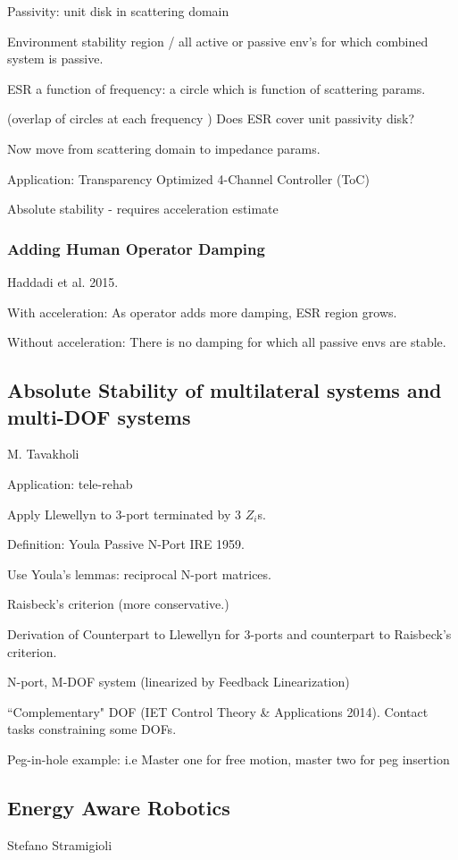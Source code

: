\documentclass[letterpaper]{article}
\begin{document}
Passivity:  unit disk in scattering domain

Environment stability region / all active or passive env's for which combined system is passive. 

ESR a function of frequency:  a circle which is function of scattering params.

(overlap of circles at each frequency )  Does ESR cover unit passivity disk?

Now move from scattering domain to impedance params. 

Application: Transparency Optimized 4-Channel Controller  (ToC)

Absolute stability - requires acceleration estimate  

\subsubsection{Adding Human Operator Damping}
Haddadi et al. 2015.

With acceleration:
As operator adds more damping, ESR region grows. 

Without acceleration:
There is no damping for which all passive envs are stable. 

\subsection{Absolute Stability of multilateral systems and multi-DOF systems}
M. Tavakholi

Application: tele-rehab

Apply Llewellyn to 3-port terminated by 3 $Z_i$s.

Definition:  Youla Passive N-Port IRE 1959.

Use Youla's lemmas: reciprocal N-port matrices. 

Raisbeck's criterion  (more conservative.)

Derivation of Counterpart to Llewellyn for 3-ports and counterpart to Raisbeck's criterion.

N-port, M-DOF system (linearized by Feedback Linearization)

``Complementary" DOF (IET Control Theory \& Applications 2014).  Contact tasks constraining some DOFs.

Peg-in-hole example: i.e Master one for free motion, master two for peg insertion


\subsection{Energy Aware Robotics} Stefano Stramigioli
\end{document}
